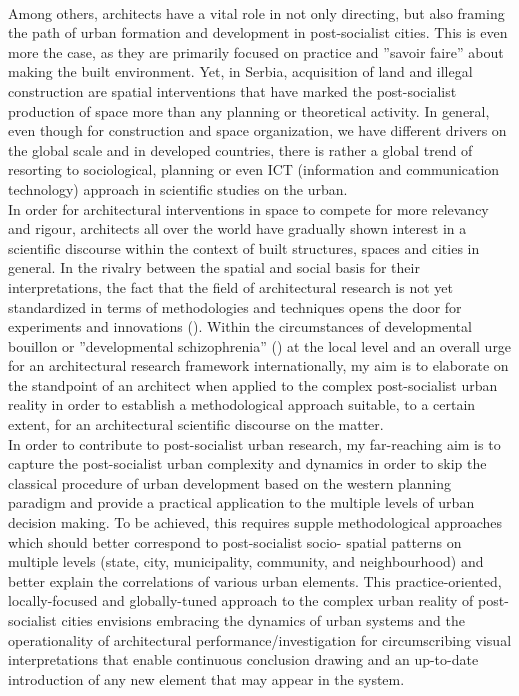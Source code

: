 \documentclass[11pt]{report}
\begin{document}
\\
Among others, architects have a vital role in not only directing, but also framing the path of urban formation and development in post-socialist cities. This is even more the case, as they are primarily focused on practice and ”savoir faire” about making the built environment. Yet, in Serbia, acquisition of land and illegal construction are spatial interventions that have marked the post-socialist production of space more than any planning or theoretical activity. In general, even though for construction and space organization, we have different drivers on the global scale and in developed countries, there is rather a global trend of resorting to sociological, planning or even ICT (information and communication technology) approach in scientific studies on the urban. 
\\
In order for architectural interventions in space to compete for more relevancy and rigour, architects all over the world have gradually shown interest in a scientific discourse within the context of built structures, spaces and cities in general. In the rivalry between the spatial and social basis for their interpretations, the fact that the field of architectural research is not yet standardized in terms of methodologies and techniques opens the door for experiments and innovations (\href{ref}{\citealt{ref}}). Within the circumstances of developmental bouillon or ”developmental schizophrenia” (\href{Vujosevic}{\citealt{Vujosevic}}) at the local level and an overall urge for an architectural research framework internationally, my aim is to elaborate on the standpoint of an architect when applied to the complex post-socialist urban reality in order to establish a methodological approach suitable, to a certain extent, for an architectural scientific discourse on the matter.
\\
In order to contribute to post-socialist urban research, my far-reaching aim is to capture the post-socialist urban complexity and dynamics in order to skip the classical procedure of urban development based on the western planning paradigm and provide a practical application to the multiple levels of urban decision making. To be achieved, this requires supple methodological approaches which should better correspond to post-socialist socio- spatial patterns on multiple levels (state, city, municipality, community, and neighbourhood) and better explain the correlations of various urban elements. This practice-oriented, locally-focused and globally-tuned approach to the complex urban reality of post-socialist cities envisions embracing the dynamics of urban systems and the operationality of architectural performance/investigation for circumscribing visual interpretations that enable continuous conclusion drawing and an up-to-date introduction of any new element that may appear in the system.
\end{document}
